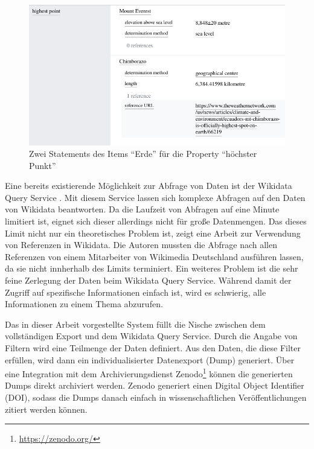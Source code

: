 \begin{figure}
  \includegraphics[width=\linewidth]{pics/example-statement}
  \caption{Zwei Statements des Items "`Erde"' für die Property "`höchster Punkt"'}
  \label{fig:sample-statement}
\end{figure} 

Eine bereits existierende Möglichkeit zur Abfrage von Daten ist der Wikidata Query Service \cite{wd-sparql}. 
Mit diesem Service lassen sich komplexe Abfragen auf den Daten von Wikidata beantworten.
Da die Laufzeit von Abfragen auf eine Minute limitiert ist, eignet sich dieser allerdings nicht für große Datenmengen.
Das dieses Limit nicht nur ein theoretisches Problem ist, zeigt eine Arbeit zur Verwendung von Referenzen in Wikidata\cite{wd-wk-common-references}.
Die Autoren mussten die Abfrage nach allen Referenzen von einem Mitarbeiter von Wikimedia Deutschland ausführen lassen, da sie nicht innherhalb des Limits terminiert.
Ein weiteres Problem ist die sehr feine Zerlegung der Daten beim Wikidata Query Service.
Während damit der Zugriff auf spezifische Informationen einfach ist, wird es schwierig, alle Informationen zu einem Thema abzurufen.

Das in dieser Arbeit vorgestellte System füllt die Nische zwischen dem vollständigen Export und dem Wikidata Query Service.
Durch die Angabe von Filtern wird eine Teilmenge der Daten definiert.
Aus den Daten, die diese Filter erfüllen, wird dann ein individualisierter Datenexport (Dump) generiert.
Über eine Integration mit dem Archivierungsdienst Zenodo\footnote{\url{https://zenodo.org/}} können die generierten Dumps direkt archiviert werden.
Zenodo generiert einen Digital Object Identifier (DOI), sodass die Dumps danach einfach in wissenschaftlichen Veröffentlichungen zitiert werden können.

